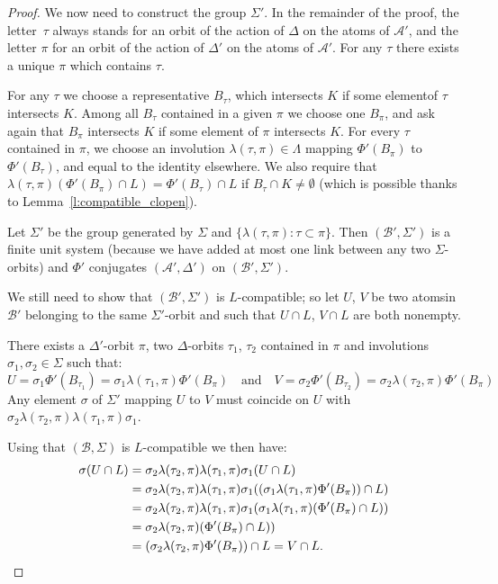 \documentclass[AHL,Unicode]{cedram}
\newcommand{\mcA}{\mathcal{A}}
\newcommand{\mcB}{\mathcal{B}}
\begin{document}
\begin{proof}
We now need to construct the group $\Sigma'$. In the remainder of the proof, the letter~$\tau$ always stands for an orbit of the action of $\Delta$ on the atoms of $\mcA'$, and the letter $\pi$ for an orbit of the action of $\Delta'$ on the atoms of $\mcA'$. For any $\tau$ there exists a unique $\pi$ which contains $\tau$.

For any $\tau$ we choose a representative $B_\tau$, which intersects $K$ if some element\linebreak of $\tau$ intersects $K$. Among all $B_\tau$ contained in a given $\pi$ we choose one $B_{\pi}$, and ask again that $B_{\pi}$ intersects $K$ if some element of $\pi$ intersects $K$. For every $\tau$ contained in $\pi$, we choose an involution $\lambda(\tau,\pi)\in \Lambda$ mapping $\Phi'(B_{\pi})$ to $\Phi'(B_\tau)$, and equal to the identity elsewhere. We also require that $\lambda(\tau,\pi)(\Phi'(B_{\pi}) \cap L)=\Phi'(B_\tau) \cap L$ if $B_\tau \cap K \ne \emptyset$ (which is possible thanks to Lemma~\ref{l:compatible_clopen}).


Let $\Sigma'$ be the group generated by $\Sigma$ and $\{\lambda(\tau,\pi) : \tau \subset \pi\}$. Then $(\mcB',\Sigma')$ is a finite unit system (because we have added at most one link between any two $\Sigma$-orbits) and $\Phi'$ conjugates $(\mcA',\Delta')$ on $(\mcB',\Sigma')$.


We still need to show that $(\mcB',\Sigma')$ is $L$-compatible; so let $U$, $V$ be two atoms\linebreak in $\mcB'$ belonging to the same $\Sigma'$-orbit and such that $U \cap L$, $V \cap L$ are both nonempty.

There exists a $\Delta'$-orbit $\pi$, two $\Delta$-orbits $\tau_1$, $\tau_2$ contained in $\pi$ and involutions $\sigma_1, \sigma_2 \in \Sigma$ such that:
\[
U= \sigma_1 \Phi'(B_{\tau_1})= \sigma_1 \lambda(\tau_1,\pi) \Phi'(B_{\pi}) \quad\text{and}\quad V= \sigma_2 \Phi'(B_{\tau_2}) = \sigma_2\lambda(\tau_2,\pi) \Phi'(B_{\pi})
\]
Any element $\sigma$ of $\Sigma'$ mapping $U$ to $V$ must coincide on $U$ with $\sigma_2 \lambda(\tau_2,\pi) \lambda(\tau_1,\pi) \sigma_1$.

Using that $(\mcB,\Sigma)$ is $L$-compatible we then have:
\begin{align*}
\sigma(U \cap L) & = \sigma_2 \lambda(\tau_2,\pi) \lambda(\tau_1,\pi)\sigma_1(U \cap L)\\
&= \sigma_2 \lambda(\tau_2,\pi) \lambda(\tau_1,\pi)\sigma_1 ((\sigma_1 \lambda(\tau_1,\pi) \Phi'(B_\pi)) \cap L) \\
& = \sigma_2 \lambda(\tau_2,\pi) \lambda(\tau_1,\pi)\sigma_1 (\sigma_1 \lambda(\tau_1,\pi) (\Phi'(B_\pi) \cap L)) \\
& = \sigma_2 \lambda(\tau_2,\pi) (\Phi'(B_\pi) \cap L))\\
& = (\sigma_2 \lambda(\tau_2,\pi) \Phi'(B_\pi)) \cap L = V \cap L. \qedhere
\end{align*}
\end{proof}
\end{document}
